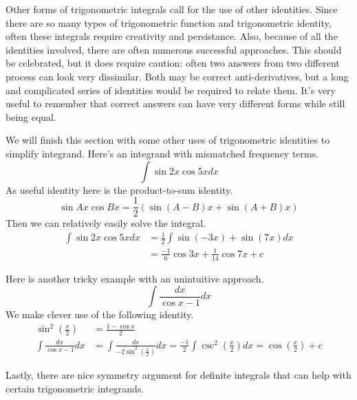 \documentclass[fleqn]{report}
\begin{document}
Other forms of trigonometric integrals call for the use of
other identities. Since there are so many types of
trigonometric function and trigonometric identity, often these
integrals require creativity and persistance. Also, because of
all the identities involved, there are often numerous
successful approaches. This should be celebrated, but it does
require caution: often two answers from two different process
can look very dissimilar. Both may be correct
anti-derivatives, but a long and complicated series of
identities would be required to relate them. It's very useful
to remember that correct answers can have very different forms
while still being equal.

\begin{example}
We will finish this section with some other uses of
trigonometric identities to simplify integrand. Here's an
integrand with mismatched frequency terms.
\begin{equation*}
\int \sin 2x \cos 5x dx 
\end{equation*}
As useful identity here is the product-to-sum identity. 
\begin{equation*}
\sin Ax \cos Bx = \frac{1}{2} \left( \sin (A-B)x + \sin (A+B)x
\right) 
\end{equation*}
Then we can relatively easily solve the integral.
\begin{align*}
\int \sin 2x \cos 5x dx & = \frac{1}{2} \int \sin (-3x) + \sin
(7x) dx \\
 & = \frac{-1}{6} \cos 3x + \frac{1}{14} \cos 7x + c
\end{align*}
\end{example}

\begin{example}
Here is another tricky example with an unintuitive approach.
\begin{equation*}
\int \frac{dx}{\cos x - 1} dx 
\end{equation*}
We make clever use of the following identity.
\begin{align*}
\sin^2 \left(\frac{x}{2} \right) & = \frac{1-\cos x}{2} \\
\int \frac{dx}{\cos x - 1} dx & = \int \frac{dx}{ -2\sin^2 \left(
\frac{x}{2} \right) } dx = \frac{-1}{2} \int \csc^2 \left(
\frac{x}{2} \right) dx = \cos \left( \frac{x}{2} \right) + c
\end{align*}
\end{example}

Lastly, there are nice symmetry argument for definite
integrals that can help with certain trigonometric integrands.
\end{document}
